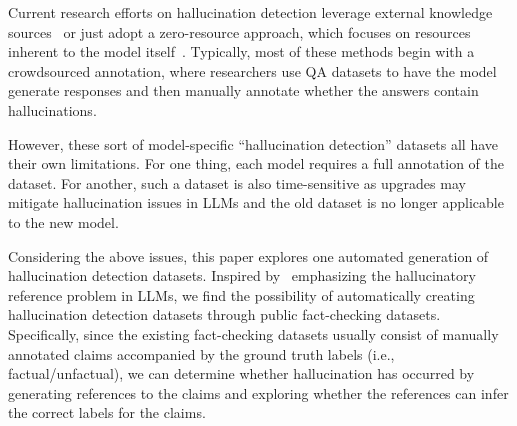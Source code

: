 Current research efforts on hallucination detection leverage external knowledge sources~\citep{chern2023factool,gou2023critic} or just adopt a zero-resource approach, which focuses on resources inherent to the model itself~\citep{azaria2023internal,agrawal2023language,varshney2023stitch,selfcheckgpt,mundler2023self}.
Typically, most of these methods begin with a crowdsourced annotation, where researchers use QA datasets to have the model generate responses and then manually annotate whether the answers contain hallucinations.

However, these sort of model-specific “hallucination detection” datasets all have their own limitations. For one thing, each model requires a full annotation of the dataset. For another, such a dataset is also time-sensitive as upgrades may mitigate hallucination issues in LLMs and the old dataset is no longer applicable to the new model.





Considering the above issues, this paper explores one automated generation of hallucination detection datasets. Inspired by~\cite{agrawal2023language} emphasizing the hallucinatory reference problem in LLMs, we find the possibility of automatically creating hallucination detection datasets through public fact-checking datasets. Specifically, since the existing fact-checking datasets usually consist of manually annotated claims accompanied by the ground truth labels (i.e.,  factual/unfactual), we can determine whether hallucination has occurred by generating references to the claims and exploring whether the references can infer the correct labels for the claims.


